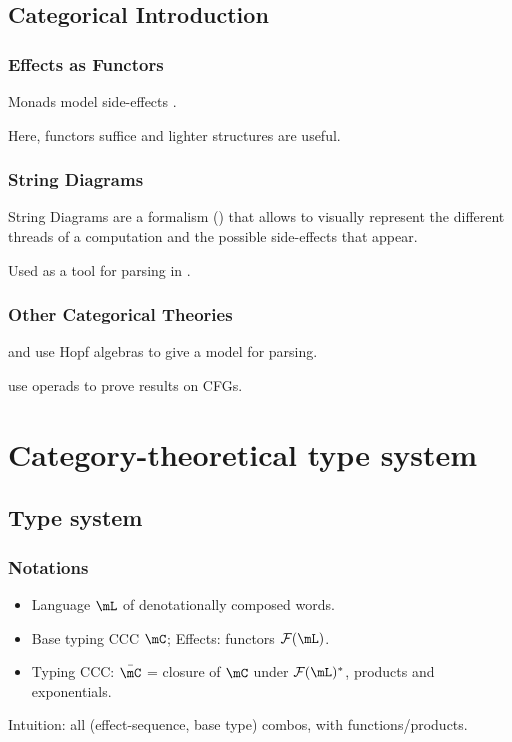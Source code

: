 \documentclass[math, english, info]{beamercours}
\begin{document}
\subsection{Categorical Introduction}
\begin{frame}
	\frametitle{Effects as Functors}
	Monads model side-effects \cite{moggiComputationalLambdacalculusMonads1989}.
	\pause

	Here, functors suffice and lighter structures are useful.
\end{frame}

\begin{frame}
	\frametitle{String Diagrams}
	String Diagrams are a formalism (\cite{hinzeIntroducingStringDiagrams2023})
	that allows to visually represent the different threads of a
	computation and the possible side-effects that appear.

	\pause
	Used as a tool for parsing in \cite{coeckeMathematicalFoundationsCompositional2010}.
\end{frame}

\begin{frame}
	\frametitle{Other Categorical Theories}
	\cite{marcollimatildeetchomskynoametberwickrobertc.MathematicalStructureSyntactic}
	and \cite{senturiaAlgebraicStructureMorphosyntax2025} use Hopf algebras to
	give a model for parsing.

	\medskip

	\cite{melliesCategoricalContoursChomskySchutzenberger2025} use operads to
	prove results on CFGs.
\end{frame}

\section{Category-theoretical type system}
\subsection{Type system}
\begin{frame}
	\frametitle{Notations}
	\begin{itemize}
		\item Language $\mL$ of denotationally composed words.
		\item Base typing CCC $\mC$; Effects: functors $\mathcal{F}(\mL)$.
		      \pause
		\item Typing CCC: $\bar{\mC}$ = closure of $\mC$ under $\mathcal{F}(\mL)^{*}$, products and exponentials.
	\end{itemize}
	Intuition: all (effect-sequence, base type) combos, with functions/products.
\end{frame}
\end{document}
